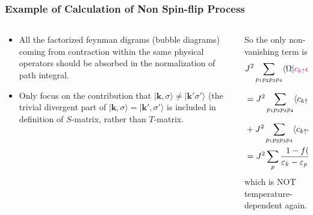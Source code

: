 \documentclass[10pt,aspectratio=43,xcolor=x11names,t]{beamer}%
\begin{document}
		\begin{frame}\frametitle{Example of Calculation of Non Spin-flip Process}
			\begin{columns}
				\begin{column}{0.38\textwidth}
					\begin{itemize}
						\item All the factorized feynman digrams (bubble diagrams) coming from contraction within the same physical operators should be absorbed in the normalization of path integral.
						\item Only focus on the contribution that $|\bm{k},\sigma\rangle\neq|\bm{k'}\sigma'\rangle$ (the trivial divergent part of $|\bm{k},\sigma\rangle=|\bm{k'},\sigma'\rangle$ is included in definition of $S$-matrix, rather than $T$-matrix.
					\end{itemize}
				\end{column}
				\pause
				\begin{column}{0.7\textwidth}
					So the only non-vanishing term is
					\begin{align*}
						&J^2\sum_{p_1p_2p_3p_4}\langle\Omega|{\color{magenta}c_{k\uparrow}}{\color{red}c_{p_1\uparrow}^\dagger c_{p_2\uparrow}}S_d^z \hat{G}{\color{blue}c_{p_3\uparrow}^\dagger c_{p_4\uparrow}}S_d^z{\color{magenta}c_{k'\uparrow}^\dagger}|\Omega\rangle\\
						&=J^2\sum_{p_1p_2p_3p_4}\langle c_{k\uparrow} c_{p_1\uparrow}^\dagger\rangle S_d^z\dfrac{\langle c_{p_2\uparrow} c_{p_3\uparrow}^\dagger\rangle}{\varepsilon_k- \varepsilon_{p_2}+i\delta}S_d^z\langle c_{p_4\uparrow} c_{k'\uparrow}^\dagger\rangle\nonumber\\
						&+J^2\sum_{p_1p_2p_3p_4}\langle c_{k\uparrow} c_{p_3\uparrow}^\dagger\rangle S_d^z\dfrac{\langle c_{p_1\uparrow}^\dagger c_{p_4\uparrow}\rangle}{\varepsilon_k-\varepsilon_{p_4}+i\delta}S_d^z\langle c_{p_2\uparrow} c_{k'\uparrow}^\dagger\rangle\nonumber\\
						&=J^2\sum_p\dfrac{1-f(\varepsilon_p)}{\varepsilon_k- \varepsilon_p+i\delta}S_d^z+J^2\sum_p\dfrac{f(\varepsilon_p)}{\varepsilon_k- \varepsilon_p+i\delta}S_d^z,
					\end{align*}
					which is NOT temperature-dependent again.
				\end{column}
			\end{columns}
		\end{frame}
\end{document}
